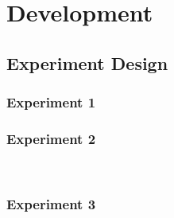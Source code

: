 \chapter{Development}

\section{Experiment Design}

\subsection{Experiment 1}

\subsection{Experiment 2}\\

\subsection{Experiment 3}\\
